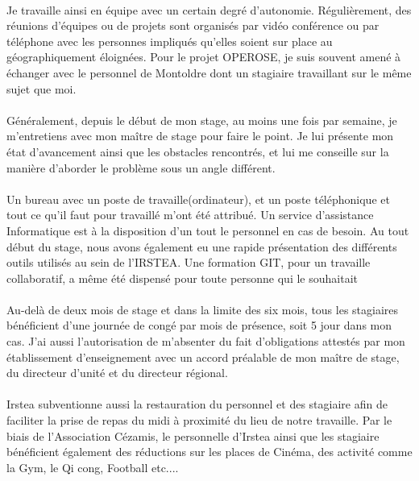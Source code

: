 \paragraph{}
Je travaille ainsi en équipe avec un certain degré d'autonomie. Régulièrement, des réunions d'équipes ou de projets sont organisés par vidéo conférence ou par téléphone avec les personnes impliqués qu'elles soient sur place au géographiquement éloignées. Pour le projet OPEROSE, je suis souvent amené à échanger avec le personnel de Montoldre dont un stagiaire travaillant sur le même sujet que moi.
\paragraph{}
Généralement, depuis le début de mon stage, au moins une fois par semaine, je m'entretiens avec mon maître de stage pour faire le point. Je lui présente mon état d'avancement ainsi que les obstacles rencontrés, et lui me conseille sur la manière d'aborder le problème sous un angle différent.
\paragraph{}
Un bureau avec un poste de travaille(ordinateur), et un poste téléphonique et tout ce qu'il faut pour travaillé m'ont été attribué. Un service d'assistance Informatique est à la disposition d'un tout le personnel en cas de besoin. Au tout début du stage, nous avons également eu une rapide présentation des différents outils utilisés au sein de l'IRSTEA. Une formation GIT, pour un travaille collaboratif, a même été dispensé pour toute personne qui le souhaitait 
\paragraph{}
Au-delà de deux mois de stage et dans la limite des six mois, tous les stagiaires bénéficient d'une journée de congé par mois de présence, soit 5 jour dans mon cas. J'ai aussi l'autorisation de m'absenter du fait d'obligations attestés par mon établissement d'enseignement avec un accord préalable de mon maître de stage, du directeur d'unité et du directeur régional.
\paragraph{}
Irstea subventionne aussi la restauration du personnel et des stagiaire afin de faciliter la prise de repas du midi à proximité du lieu de notre travaille. Par le biais de l'Association Cézamis, le personnelle d'Irstea ainsi que les stagiaire bénéficient également des réductions sur les places de Cinéma, des activité comme la Gym, le Qi cong, Football etc....